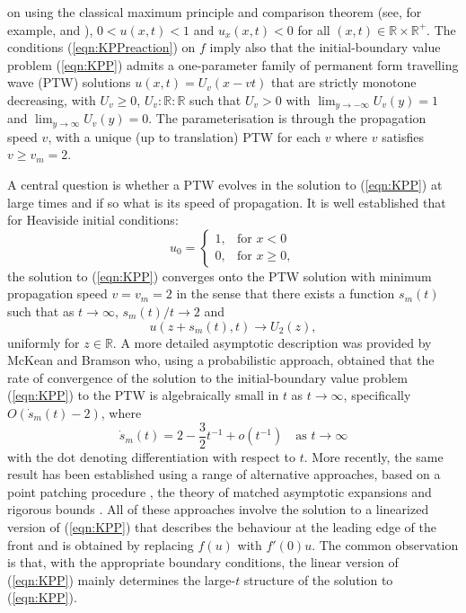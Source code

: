 \documentclass[11pt,a4paper]{article}
\newcommand{\eeref}[1]{(\ref{eqn:#1})}
\newcommand{\eelab}[1]{\label{eqn:#1}}
\def\beq{\begin{equation}}
\def\eeq{\end{equation}}
\begin{document}
	  on using the classical 
	  maximum principle and comparison theorem (see, for example, \cite{AronsonSerrin1967} and \cite{Fife1979}),
	  $0 < u(x,t) < 1$ and $u_x(x,t)<0$ for all $(x,t) \in\mathbb{R}\times \mathbb{R}^+$.
%
The conditions \eeref{KPPreaction} on $f$ imply also that 
the initial-boundary value problem \eeref{KPP}
admits a one-parameter family of permanent form travelling wave (PTW) solutions  
$u(x,t)=U_v(x-vt)$ that are    strictly monotone decreasing, with $U_v\geq 0$,
$U_v: \mathbb{R}:\mathbb{R}$ such that $U_v>0$ with  
 $\lim_{y\to-\infty}U_v(y)=1$ 
and $\lim_{y\to\infty}U_v(y)=0$. 
The parameterisation is through the propagation speed $v$, with a unique 
(up to translation) PTW for each $v$ where $v$ satisfies 
 $v\geq v_m=2$. 


A central question is whether
a  PTW 
evolves  in the
solution to  \eeref{KPP}  
 at large times  
and if so what is its speed of propagation. 
%
It is well established \cite{AronsonWeinberger1975,FifeMcLeod1977,Kolmogorov_etal1937} that for Heaviside initial conditions:
\beq\eelab{step}
 u_0=\begin{cases}
		 1, & \text{for $x <0$}\\
	             0, & \text{for $x \geq 0$},
	\end{cases} 
\eeq
 the solution to  \eeref{KPP}  
 converges onto
the PTW  solution  with minimum propagation speed $v=v_m=2$
in the sense that there exists a function $s_m(t)$
such that as $t\to\infty$,
 $s_m(t)/t \to 2$ and 
\beq
u(z+s_m(t),t)\to U_2(z),
 \eeq
uniformly for $z\in\mathbb{R}$. 
%
A more detailed asymptotic description was 
 provided by McKean \cite{McKean1975,McKean1976} and Bramson \cite{Bramson1978,Bramson1983}
who, using a probabilistic approach, obtained 
that the rate of 
 convergence of  the solution to the initial-boundary value problem \eeref{KPP} to the 
PTW is  algebraically small  in $t$
as $t\to\infty$, specifically
$O(\dot s_m(t)-2)$, 
where 
\beq\eelab{BramsonFisher}
\dot s_m(t)=2-\frac{3}{2}t^{-1}+o(t^{-1})\quad\text{as $t\to\infty$}
\eeq
with the dot denoting differentiation with respect to $t$.
%
More recently, the same result has been established  
using a range of alternative approaches, based on  a point patching procedure \cite{BrunetDerrida1997,EbertvanSarloos2000}, 
the theory of matched asymptotic expansions \cite{BillinghamNeedham1992,LeachNeedham2003} and 
rigorous bounds  \cite{Hamel_etal2013}. 
All of these approaches  involve the solution to a linearized version  of  \eeref{KPP} that  describes the behaviour at the leading edge
of the front and is 
obtained by replacing $f(u)$ with $f'(0)u$. The common observation is that, with the appropriate boundary conditions, 
the linear version  of  \eeref{KPP} mainly determines 
the large-$t$ structure of the solution to \eeref{KPP}. 
%
\end{document}

